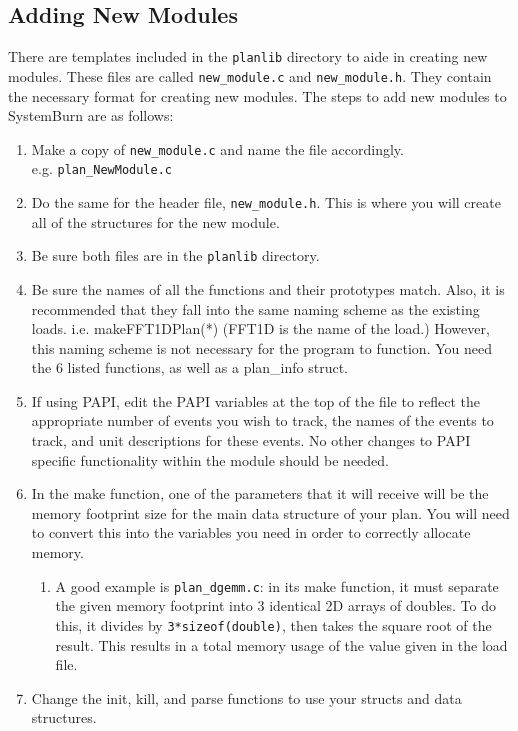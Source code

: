 \subsection{Adding New Modules}

There are templates included in the \verb!planlib! directory to aide
in creating new modules. These files are called \verb!new_module.c! and
\verb!new_module.h!. They contain the necessary format for creating new
modules. The steps to add new modules to SystemBurn are as follows:

\begin{enumerate}
        \item Make a copy of \verb!new_module.c! and name the file accordingly.\\ e.g. \verb!plan_NewModule.c!
	\item Do the same for the header file, \verb!new_module.h!. This is where you will create all of the structures for the new module.
	\item Be sure both files are in the \verb!planlib! directory.
        \item Be sure the names of all the functions and their prototypes match. Also, it is recommended that they fall into the same naming scheme as the existing loads. i.e. makeFFT1DPlan(*) (FFT1D is the name of the load.) However, this naming scheme is not necessary for the program to function. You need the 6 listed functions, as well as a plan\_info struct.
        \item If using PAPI, edit the PAPI variables at the top of the file to reflect the appropriate number of events you wish to track, the names of the events to track, and unit descriptions for these events. No other changes to PAPI specific functionality within the module should be needed.
	\item In the make function, one of the parameters that it will receive will be the memory footprint size for the main data structure of your plan. You will need to convert this into the variables you need in order to correctly allocate memory.
		\begin{enumerate}
			\item A good example is \verb!plan_dgemm.c!: in its make function, it must separate the given memory footprint into 3 identical 2D arrays of doubles. To do this, it divides by \verb!3*sizeof(double)!, then takes the square root of the result. This results in a total memory usage of the value given in the load file.
		\end{enumerate}
        \item Change the init, kill, and parse functions to use your structs and data structures.

\end{enumerate}
